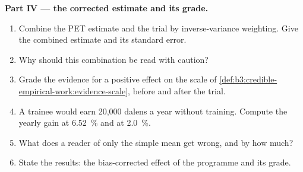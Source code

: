 \begin{problem}
\medskip\noindent\textbf{Part IV --- the corrected estimate and its grade.}
\begin{enumerate}[resume]
\item Combine the PET estimate and the trial by inverse-variance weighting.
Give the combined estimate and its standard error.
\item Why should this combination be read with caution?
\item Grade the evidence for a positive effect on the scale of
\cref{def:b3:credible-empirical-work:evidence-scale}, before and after the trial.
\item A trainee would earn 20{,}000 dalens a year without training. Compute
the yearly gain at 6.52~\% and at 2.0~\%.
\item What does a reader of only the simple mean get wrong, and by how much?
\item State the results: the bias-corrected effect of the programme and its
grade.
\end{enumerate}
\end{problem}
